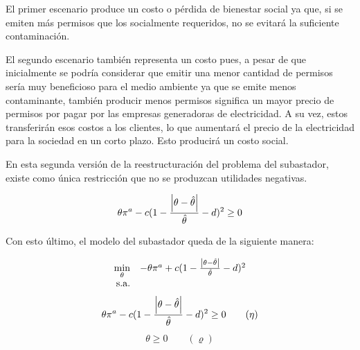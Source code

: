 El primer escenario produce un costo o pérdida de bienestar social ya que, si se emiten más permisos que los socialmente requeridos, no se evitará la suficiente contaminación. 
\vspace{2.5mm}

El segundo escenario también representa un costo pues, a pesar de que inicialmente se podría considerar que emitir una menor cantidad de permisos sería muy beneficioso para el medio ambiente ya que se emite menos contaminante, también producir menos permisos significa un mayor precio de permisos por pagar por las empresas generadoras de electricidad. A su vez, estos transferirán esos costos a los clientes, lo que aumentará el precio de la electricidad para la sociedad en un corto plazo. Esto producirá un costo social. 
\vspace{2.5mm}

En esta segunda versión de la reestructuración del problema del subastador, existe como única restricción que no se produzcan utilidades negativas.
\vspace{2.5mm}

\begin{equation}
\begin{array}{rrclcl}
\displaystyle \theta \pi^a - c(1-\frac{\abs{\theta - \hat{\theta}}}{\hat{\theta}}-d)^2 \geq 0  \\
\end{array}
\end{equation}

Con esto último, el modelo del subastador queda de la siguiente manera:

\begin{equation}
\begin{array}{rrclcl}
\displaystyle \min_{\theta} & -\theta \pi^a + c(1-\frac{\abs{\theta - \hat{\theta}}}{\hat{\theta}}-d)^2 \\\textrm{s.a.} \label{fo:social}\\
\end{array}
\end{equation}
\begin{equation}
\begin{array}{rrclcl}
\displaystyle \theta \pi^a - c(1-\frac{\abs{\theta - \hat{\theta}}}{\hat{\theta}}-d)^2 \geq 0 \qquad (\eta)\label{social:r1}
\end{array}
\end{equation}
\begin{equation}
\begin{array}{rrclcl}
\theta \geq 0 \qquad (\varrho)\label{social:r11}
\end{array}
\end{equation}

